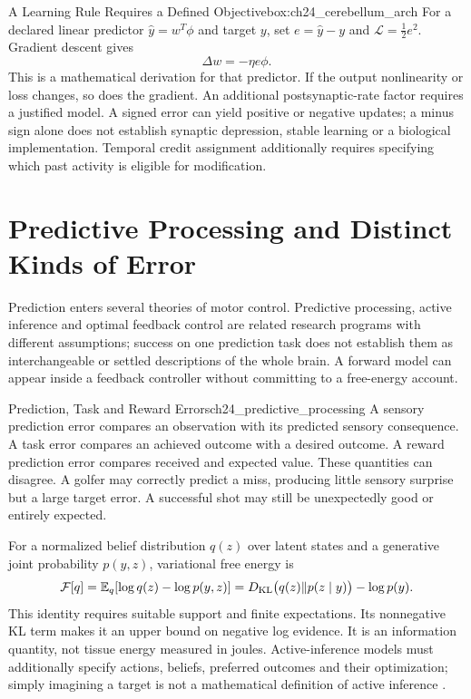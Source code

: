 \begin{example}{A Learning Rule Requires a Defined Objective}{box:ch24_cerebellum_arch}
For a declared linear predictor $\hat y=w^T\phi$ and target $y$, set $e=\hat y-y$ and $\mathcal L=\tfrac12 e^2$. Gradient descent gives
\begin{equation}
\Delta w=-\eta e\phi.
\label{eq:ch24_cerebellar_learning}
\end{equation}
This is a mathematical derivation for that predictor. If the output nonlinearity or loss changes, so does the gradient. An additional postsynaptic-rate factor requires a justified model. A signed error can yield positive or negative updates; a minus sign alone does not establish synaptic depression, stable learning or a biological implementation. Temporal credit assignment additionally requires specifying which past activity is eligible for modification.
\end{example}

\section{Predictive Processing and Distinct Kinds of Error}
\label{sec:ch24_predictive_processing}
Prediction enters several theories of motor control. Predictive processing, active inference and optimal feedback control are related research programs with different assumptions; success on one prediction task does not establish them as interchangeable or settled descriptions of the whole brain. A forward model can appear inside a feedback controller without committing to a free-energy account.

\begin{definition}{Prediction, Task and Reward Errors}{ch24_predictive_processing}
A sensory prediction error compares an observation with its predicted sensory consequence. A task error compares an achieved outcome with a desired outcome. A reward prediction error compares received and expected value. These quantities can disagree. A golfer may correctly predict a miss, producing little sensory surprise but a large target error. A successful shot may still be unexpectedly good or entirely expected.
\end{definition}

For a normalized belief distribution $q(z)$ over latent states and a generative joint probability $p(y,z)$, variational free energy is
\[
\mathcal F[q]=\mathbb E_q[\log q(z)-\log p(y,z)]
=D_{\rm KL}\bigl(q(z)\Vert p(z\mid y)\bigr)-\log p(y).
\]
This identity requires suitable support and finite expectations. Its nonnegative KL term makes it an upper bound on negative log evidence. It is an information quantity, not tissue energy measured in joules. Active-inference models must additionally specify actions, beliefs, preferred outcomes and their optimization; simply imagining a target is not a mathematical definition of active inference \citep{Friston2010ActionModel}.

